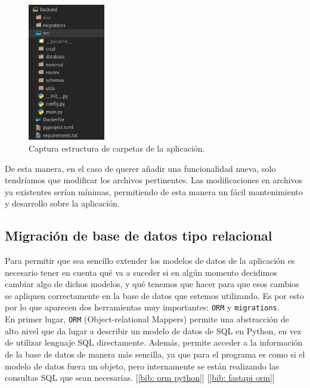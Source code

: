 \documentclass[a4paper, oneside, 12pt]{book}
\begin{document}
	\pagebreak
	
	\begin{figure}[h!]
		\begin{center}
			\includegraphics[width=0.3\textwidth]{img/folder_structure.jpg}
			\caption{Captura estructura de carpetas de la aplicación.}
			\label{img: folder structure}
		\end{center}
	\end{figure}

	\noindent De esta manera, en el caso de querer añadir una funcionalidad nueva, solo tendríamos que modificar los archivos pertinentes. Las modificaciones en archivos ya existentes serían mínimas, permitiendo de esta manera un fácil mantenimiento y desarrollo sobre la aplicación. \\
	
	\subsection{Migración de base de datos tipo relacional}
	
	\noindent Para permitir que sea sencillo extender los modelos de datos de la aplicación es necesario tener en cuenta qué va a suceder si en algún momento decidimos cambiar algo de dichos modelos, y qué tenemos que hacer para que esos cambios se apliquen correctamente en la base de datos que estemos utilizando. Es por esto por lo que aparecen dos herramientas muy importantes: \texttt{ORM} y \texttt{migrations}.  \\
	
	\noindent En primer lugar, \texttt{ORM} (Object-relational Mappers) permite una abstracción de alto nivel que da lugar a describir un modelo de datos de SQL en Python, en vez de utilizar lenguaje SQL directamente. Además, permite acceder a la información de la base de datos de manera más sencilla, ya que para el programa es como si el modelo de datos fuera un objeto, pero internamente se están realizando las consultas SQL que sean necesarias. [\ref{bib: orm python}] [\ref{bib: fastapi orm}] \\
	
\end{document}
